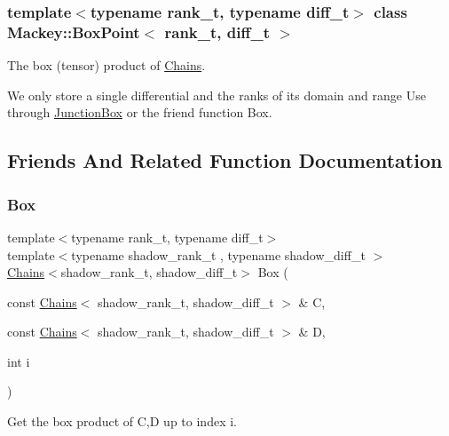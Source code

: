 \subsubsection*{template$<$typename rank\+\_\+t, typename diff\+\_\+t$>$\newline
class Mackey\+::\+Box\+Point$<$ rank\+\_\+t, diff\+\_\+t $>$}

The box (tensor) product of \hyperlink{classMackey_1_1Chains}{Chains}. 

We only store a single differential and the ranks of its domain and range Use through \hyperlink{classMackey_1_1JunctionBox}{Junction\+Box} or the friend function Box. 

\subsection{Friends And Related Function Documentation}
\mbox{\label{classMackey_1_1BoxPoint_a0d7cf2b5aed908bc9bc696c03b011d76}} 
\subsubsection{\texorpdfstring{Box}{Box}}
{\footnotesize\ttfamily template$<$typename rank\+\_\+t, typename diff\+\_\+t$>$ \\
template$<$typename shadow\+\_\+rank\+\_\+t , typename shadow\+\_\+diff\+\_\+t $>$ \\
\hyperlink{classMackey_1_1Chains}{Chains}$<$shadow\+\_\+rank\+\_\+t, shadow\+\_\+diff\+\_\+t$>$ Box (\begin{DoxyParamCaption}\item[{const \hyperlink{classMackey_1_1Chains}{Chains}$<$ shadow\+\_\+rank\+\_\+t, shadow\+\_\+diff\+\_\+t $>$ \&}]{C,  }\item[{const \hyperlink{classMackey_1_1Chains}{Chains}$<$ shadow\+\_\+rank\+\_\+t, shadow\+\_\+diff\+\_\+t $>$ \&}]{D,  }\item[{int}]{i }\end{DoxyParamCaption})\hspace{0.3cm}{\ttfamily [friend]}}



Get the box product of C,D up to index i. 

\mbox{\label{classMackey_1_1BoxPoint_aa6b9506519f57502db8432843a492fd1}} 
